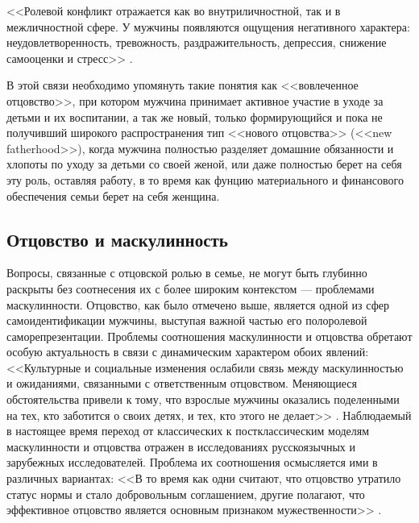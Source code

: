 \documentclass{../../common/thesisbyxetex}
\begin{document}
<<Ролевой конфликт отражается как во внутриличностной, так и в межличностной
сфере. У мужчины появляются ощущения негативного характера: неудовлетворенность,
тревожность, раздражительность, депрессия, снижение самооценки и стресс>> \cite[113]{confl}.






В этой связи необходимо упомянуть такие понятия как <<вовлеченное отцовство>>,
при котором мужчина принимает активное участие в уходе за детьми и их воспитании, а так же
новый,  только формирующийся и пока не получивший широкого распространения  тип <<нового
отцовства>> (<<new fatherhood>>), когда мужчина полностью разделяет домашние обязанности и хлопоты
по уходу за детьми со своей женой, или даже полностью берет на себя эту роль, оставляя работу, в то
время как фунцию материального и финансового обеспечения семьи берет на себя женщина.

\subsection{Отцовство и маскулинность}

Вопросы, связанные с отцовской ролью в семье, не могут быть глубинно раскрыты без
соотнесения их с более широким контекстом --- проблемами маскулинности. Отцовство, как было
отмечено выше, является одной из сфер самоидентификации мужчины, выступая
важной частью его полоролевой саморепрезентации. Проблемы соотношения маскулинности и отцовства
обретают особую актуальность в связи с динамическим характером обоих явлений: <<Культурные и
социальные изменения ослабили связь между маскулинностью и ожиданиями, связанными с ответственным
отцовством. Меняющиеся обстоятельства привели к тому, что взрослые мужчины оказались поделенными
на тех, кто заботится о своих детях, и тех, кто этого не делает>> \cite[132]{f21}. Наблюдаемый в
настоящее время переход от классических к постклассическим моделям маскулинности и отцовства
отражен в исследованиях русскоязычных и зарубежных исследователей. Проблема их соотношения
осмысляется ими в различных вариантах: <<В то время как одни считают, что отцовство утратило
статус нормы и стало добровольным соглашением, другие полагают, что эффективное отцовство является
основным признаком мужественности>> \cite[132]{f21}.
\end{document}
